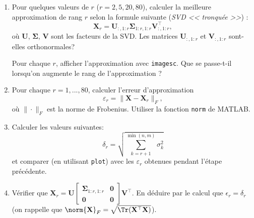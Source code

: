 \begin{enumerate}
\item Pour quelques valeurs de $r$  ($r=2,5,20,80$), calculer la meilleure approximation de rang $r$ selon la formule suivante (\emph{SVD << tronquée >>}) :
\[
\mathbf{X}_r = \mathbf{U}_{:,1:r} \mathbf{\Sigma}_{1:r,1:r} \mathbf{V}_{:,1:r}^{\top},
\]
où $\mathbf{U}$, $\mathbf{\Sigma}$, $\mathbf{V}$ sont les facteurs  de la SVD. Les matrices $\mathbf{U}_{:,1:r}$ et $\mathbf{V}_{:,1:r}$ sont-elles orthonormales?

Pour chaque $r$, afficher l'approximation avec \texttt{imagesc}. Que se passe-t-il lorsqu'on augmente le rang de l'approximation ?

\item Pour chaque $r=1,...,80$, calculer l'erreur d'approximation
\[
\varepsilon_r = \|\mathbf{X}  - \mathbf{X}_r \|_F,
\]
où   $\|\cdot\|_F$  est la norme de Frobenius. Utiliser la fonction \texttt{norm} de MATLAB.

\item Calculer les valeurs suivantes:
\[
\delta_{r} = \sqrt{\sum\limits_{k=r+1}^{\min(n,m)} \sigma_k^2}
\]
et  comparer (en utilisant  \texttt{plot}) avec les $\varepsilon_r$ obtenues pendant l'étape précédente.


\item Vérifier que $\mathbf{X}_r = \mathbf{U} \begin{bmatrix} \mathbf{\Sigma}_{1:r,1:r} & \bm{0} \\  \bm{0} & \bm{0} \end{bmatrix} \mathbf{V}^\top$. En déduire par le calcul que $\epsilon_r = \delta_r$ (on rappelle que $\norm{\mathbf{X}}_F = \sqrt{\Tr(\mathbf{X}^\top \mathbf{X})}$).




\end{enumerate}

